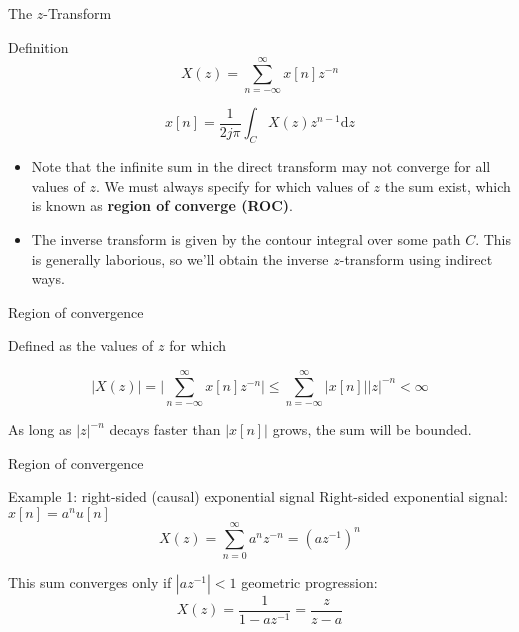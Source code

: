 \documentclass{beamer}
\begin{document}
\begin{frame}{The $z$-Transform}

\begin{block}{Definition}
	\begin{equation} \tag{Direct transform}
	X(z) = \sum_{n=-\infty}^{\infty} x[n]z^{-n} 
	\end{equation}
	
	\begin{equation}\tag{Inverse transform}
	x[n] = \frac{1}{2j\pi}\int_{C}X(z)z^{n-1}\mathrm{d}z
	\end{equation}
\end{block}

\begin{itemize}
	\item Note that the infinite sum in the direct transform may not converge for all values of $z$. We must always specify for which values of $z$ the sum exist, which is known as \textbf{region of converge (ROC)}.
	\item The inverse transform is given by the contour integral over some path $C$. This is generally laborious, so we'll obtain the inverse $z$-transform using indirect ways.
\end{itemize}
\end{frame}

\begin{frame}{Region of convergence}

Defined as the values of $z$ for which

\begin{equation*}
|X(z)| = \bigg|\sum_{n=-\infty}^{\infty}x[n]z^{-n}\bigg| \leq \sum_{n=-\infty}^{\infty} |x[n]||z|^{-n} < \infty
\end{equation*}

As long as $|z|^{-n}$ decays faster than $|x[n]|$ grows, the sum will be bounded.

\end{frame}


\begin{frame}{Region of convergence}

\begin{block}{Example 1: right-sided (causal) exponential signal}
Right-sided exponential signal: $x[n] = a^nu[n]$
\begin{equation} 
X(z) = \sum_{n=0}^\infty a^nz^{-n} = (az^{-1})^n 
\end{equation}

This sum converges only if $|az^{-1}| < 1$ geometric progression:
\begin{equation} 
X(z) = \frac{1}{1-az^{-1}} = \frac{z}{z-a}
\end{equation}

	
\end{block}

\end{frame}
\end{document}
